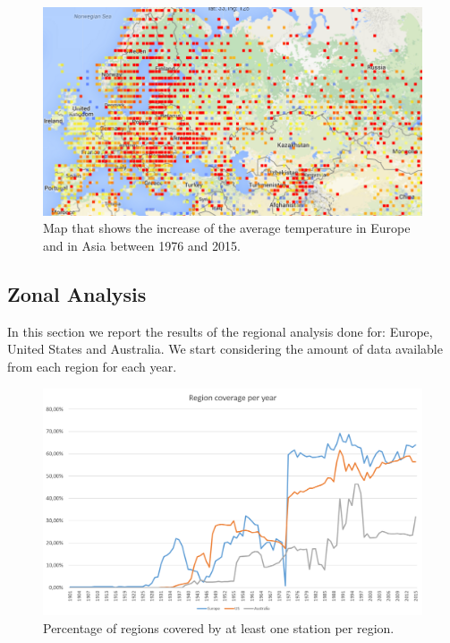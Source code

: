 \documentclass{vldb}
\begin{document}
\begin{figure}[tbh]
\includegraphics[width=1\linewidth]{increaseEurope}
\caption{Map that shows the increase of the average temperature in Europe and in Asia between 1976 and 2015.}
\label{fig:interface}
\end{figure}

\subsection{Zonal Analysis}
In this section we report the results of the regional analysis done for: Europe, United States and Australia. We start considering the amount of data available from each region for each year. 

\begin{figure}[tbh]
\includegraphics[width=1\linewidth]{stationsRegion}
\caption{Percentage of regions covered by at least one station per region.}
\label{fig:stationsRegion}
\end{figure}
\end{document}
